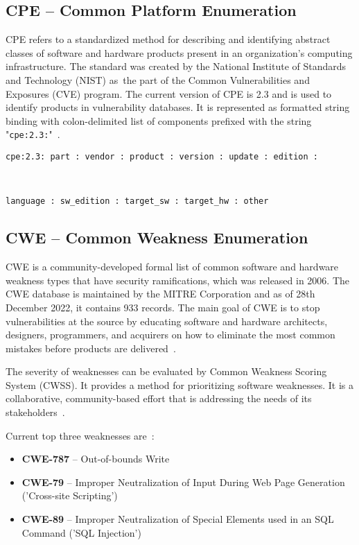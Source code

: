   \subsection*{CPE -- Common Platform Enumeration}
    CPE refers to a standardized method for describing and identifying abstract classes of software
    and hardware products present in an organization's computing infrastructure. The standard was created
    by the National Institute of Standards and Technology (NIST) as~the part of the Common Vulnerabilities
    and Exposures (CVE) program. The current version of CPE is 2.3 and is used to identify products
    in vulnerability databases. It is represented as formatted string binding with colon-delimited
    list of components prefixed with the string "\texttt{cpe:2.3:}"~\cite{CPEnaming}.\\
      \centerline{\texttt{cpe:2.3: part : vendor : product : version : update : edition :}}\\
      \centerline{\texttt{language : sw\_edition : target\_sw : target\_hw : other}}

  \subsection*{CWE -- Common Weakness Enumeration}
    CWE is a community-developed formal list of common software and hardware weakness types that
    have security ramifications, which was released in 2006. The CWE database is maintained by the MITRE Corporation
    and as of 28th December 2022, it contains 933 records. The main goal of CWE is to stop vulnerabilities
    at the source by educating software and hardware architects, designers, programmers, and acquirers
    on how to eliminate the most common mistakes before products are delivered~\cite{CWE}.

    The severity of weaknesses can be evaluated by Common Weakness Scoring System (CWSS). It provides a method
    for prioritizing software weaknesses. It is a collaborative, community-based effort that is addressing
    the needs of its stakeholders~\cite{CWSS}.

    \noindent Current top three weaknesses are~\cite{CWEtop25}:
    \begin{itemize}
      \item \textbf{CWE-787} -- Out-of-bounds Write
      \item \textbf{CWE-79} -- Improper Neutralization of Input During Web Page Generation ('Cross-site Scripting')
      \item \textbf{CWE-89} -- Improper Neutralization of Special Elements used in an SQL Command ('SQL Injection')
    \end{itemize}

